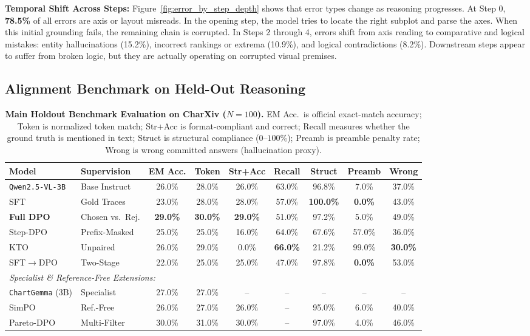 \documentclass[11pt]{article}
\begin{document}
\textbf{Temporal Shift Across Steps:} Figure~\ref{fig:error_by_step_depth} shows that error types change as reasoning progresses. At Step 0, \textbf{78.5\%} of all errors are axis or layout misreads. In the opening step, the model tries to locate the right subplot and parse the axes. When this initial grounding fails, the remaining chain is corrupted. In Steps 2 through 4, errors shift from axis reading to comparative and logical mistakes: entity hallucinations (15.2\%), incorrect rankings or extrema (10.9\%), and logical contradictions (8.2\%). Downstream steps appear to suffer from broken logic, but they are actually operating on corrupted visual premises.

\subsection{Alignment Benchmark on Held-Out Reasoning}
\label{subsec:alignment_benchmark}

\begin{table}[t]
\centering
\footnotesize
\setlength{\tabcolsep}{3.2pt}
\begin{tabular}{llccccccc}
\toprule
\textbf{Model} & \textbf{Supervision} & \textbf{EM Acc.} & \textbf{Token} & \textbf{Str+Acc} & \textbf{Recall} & \textbf{Struct} & \textbf{Preamb} & \textbf{Wrong} \\
\midrule
\texttt{Qwen2.5-VL-3B} & Base Instruct & 26.0\% & 28.0\% & 26.0\% & 63.0\% & 96.8\% & 7.0\% & 37.0\% \\
SFT & Gold Traces & 23.0\% & 28.0\% & 28.0\% & 57.0\% & \textbf{100.0\%} & \textbf{0.0\%} & 43.0\% \\
\textbf{Full DPO} & Chosen vs.\ Rej. & \textbf{29.0\%} & \textbf{30.0\%} & \textbf{29.0\%} & 51.0\% & 97.2\% & 5.0\% & 49.0\% \\
Step-DPO & Prefix-Masked & 25.0\% & 25.0\% & 16.0\% & 64.0\% & 67.6\% & 57.0\% & 36.0\% \\
KTO & Unpaired & 26.0\% & 29.0\% & 0.0\% & \textbf{66.0\%} & 21.2\% & 99.0\% & \textbf{30.0\%} \\
SFT$\rightarrow$DPO & Two-Stage & 22.0\% & 25.0\% & 25.0\% & 47.0\% & 97.8\% & \textbf{0.0\%} & 53.0\% \\
\midrule
\multicolumn{9}{l}{\textit{Specialist \& Reference-Free Extensions:}} \\
\texttt{ChartGemma} (3B) & Specialist & 27.0\% & 27.0\% & -- & -- & -- & -- & -- \\
SimPO & Ref.-Free & 26.0\% & 27.0\% & 26.0\% & -- & 95.0\% & 6.0\% & 40.0\% \\
Pareto-DPO & Multi-Filter & 30.0\% & 31.0\% & 30.0\% & -- & 97.0\% & 4.0\% & 46.0\% \\
\bottomrule
\end{tabular}
\caption{\textbf{Main Holdout Benchmark Evaluation on CharXiv ($N=100$).} EM Acc.\ is official exact-match accuracy; Token is normalized token match; Str+Acc is format-compliant and correct; Recall measures whether the ground truth is mentioned in text; Struct is structural compliance ($0$--$100$\%); Preamb is preamble penalty rate; Wrong is wrong committed answers (hallucination proxy).}
\label{tab:main_benchmark}
\end{table}
\end{document}
